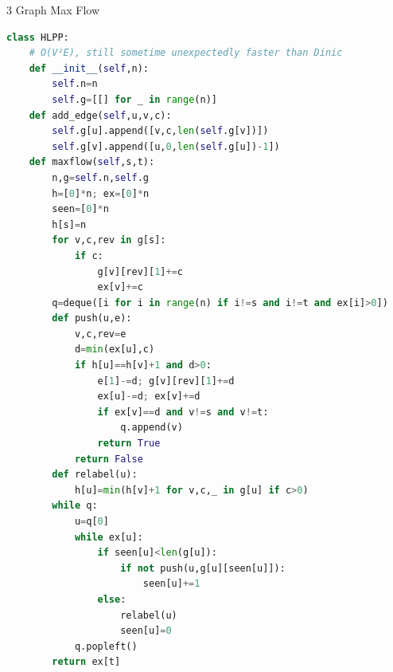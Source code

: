 \documentclass[10pt,landscape, a4paper]{article}
\begin{document}
\begin{multicols*}{3}
Graph Max Flow
\begin{lstlisting}[language=Python]
class HLPP:
    # O(V²E), still sometime unexpectedly faster than Dinic
    def __init__(self,n):
        self.n=n
        self.g=[[] for _ in range(n)]
    def add_edge(self,u,v,c):
        self.g[u].append([v,c,len(self.g[v])])
        self.g[v].append([u,0,len(self.g[u])-1])
    def maxflow(self,s,t):
        n,g=self.n,self.g
        h=[0]*n; ex=[0]*n
        seen=[0]*n
        h[s]=n
        for v,c,rev in g[s]:
            if c:
                g[v][rev][1]+=c
                ex[v]+=c
        q=deque([i for i in range(n) if i!=s and i!=t and ex[i]>0])
        def push(u,e):
            v,c,rev=e
            d=min(ex[u],c)
            if h[u]==h[v]+1 and d>0:
                e[1]-=d; g[v][rev][1]+=d
                ex[u]-=d; ex[v]+=d
                if ex[v]==d and v!=s and v!=t:
                    q.append(v)
                return True
            return False
        def relabel(u):
            h[u]=min(h[v]+1 for v,c,_ in g[u] if c>0)
        while q:
            u=q[0]
            while ex[u]:
                if seen[u]<len(g[u]):
                    if not push(u,g[u][seen[u]]):
                        seen[u]+=1
                else:
                    relabel(u)
                    seen[u]=0
            q.popleft()
        return ex[t]


\end{lstlisting}
\end{multicols*}
\end{document}
